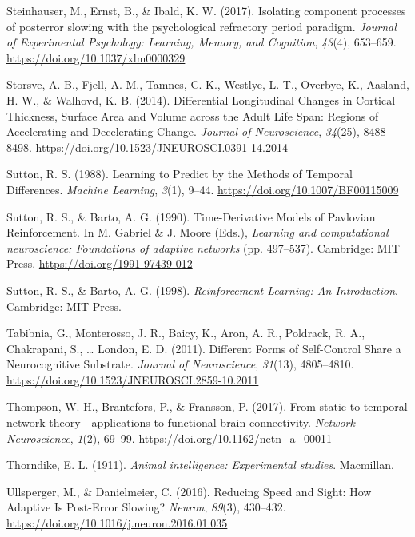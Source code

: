 \documentclass[12pt,openany]{book}
\theoremstyle{definition}
\theoremstyle{definition}
\theoremstyle{definition}
\theoremstyle{remark}
\begin{document}
\hypertarget{ref-Steinhauser2017}{}
Steinhauser, M., Ernst, B., \& Ibald, K. W. (2017). Isolating component
processes of posterror slowing with the psychological refractory period
paradigm. \emph{Journal of Experimental Psychology: Learning, Memory,
and Cognition}, \emph{43}(4), 653--659.
\url{https://doi.org/10.1037/xlm0000329}

\hypertarget{ref-Storsve2014}{}
Storsve, A. B., Fjell, A. M., Tamnes, C. K., Westlye, L. T., Overbye,
K., Aasland, H. W., \& Walhovd, K. B. (2014). Differential Longitudinal
Changes in Cortical Thickness, Surface Area and Volume across the Adult
Life Span: Regions of Accelerating and Decelerating Change.
\emph{Journal of Neuroscience}, \emph{34}(25), 8488--8498.
\url{https://doi.org/10.1523/JNEUROSCI.0391-14.2014}

\hypertarget{ref-Sutton1988}{}
Sutton, R. S. (1988). Learning to Predict by the Methods of Temporal
Differences. \emph{Machine Learning}, \emph{3}(1), 9--44.
\url{https://doi.org/10.1007/BF00115009}

\hypertarget{ref-Sutton1990}{}
Sutton, R. S., \& Barto, A. G. (1990). Time-Derivative Models of
Pavlovian Reinforcement. In M. Gabriel \& J. Moore (Eds.),
\emph{Learning and computational neuroscience: Foundations of adaptive
networks} (pp. 497--537). Cambridge: MIT Press.
\url{https://doi.org/1991-97439-012}

\hypertarget{ref-Sutton1998}{}
Sutton, R. S., \& Barto, A. G. (1998). \emph{Reinforcement Learning: An
Introduction}. Cambridge: MIT Press.

\hypertarget{ref-Tabibnia2011}{}
Tabibnia, G., Monterosso, J. R., Baicy, K., Aron, A. R., Poldrack, R.
A., Chakrapani, S., \ldots{} London, E. D. (2011). Different Forms of
Self-Control Share a Neurocognitive Substrate. \emph{Journal of
Neuroscience}, \emph{31}(13), 4805--4810.
\url{https://doi.org/10.1523/JNEUROSCI.2859-10.2011}

\hypertarget{ref-Thompson2017}{}
Thompson, W. H., Brantefors, P., \& Fransson, P. (2017). From static to
temporal network theory - applications to functional brain connectivity.
\emph{Network Neuroscience}, \emph{1}(2), 69--99.
\url{https://doi.org/10.1162/netn_a_00011}

\hypertarget{ref-Thorndike1911}{}
Thorndike, E. L. (1911). \emph{Animal intelligence: Experimental
studies}. Macmillan.

\hypertarget{ref-Ullsperger2016}{}
Ullsperger, M., \& Danielmeier, C. (2016). Reducing Speed and Sight: How
Adaptive Is Post-Error Slowing? \emph{Neuron}, \emph{89}(3), 430--432.
\url{https://doi.org/10.1016/j.neuron.2016.01.035}
\end{document}

